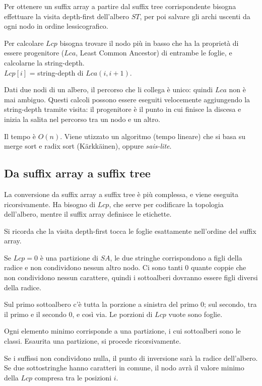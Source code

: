 Per ottenere un suffix array a partire dal suffix tree corrispondente bisogna effettuare la visita depth-first dell'albero $ST$, per poi salvare gli archi uscenti da ogni nodo in ordine lessicografico. 

Per calcolare $Lcp$ bisogna trovare il nodo più in basso che ha la proprietà di essere progenitore ($Lca$, Least Common Ancestor) di entrambe le foglie, e calcolarne la string-depth. \\
$Lcp[i]$ = string-depth di $Lca(i, i+1)$. 

Dati due nodi di un albero, il percorso che li collega è unico: quindi $Lca$ non è mai ambiguo. Questi calcoli possono essere eseguiti velocemente aggiungendo la string-depth tramite visita: il progenitore è il punto in cui finisce la discesa e inizia la salita nel percorso tra un nodo e un altro. 

Il tempo è $O(n)$. Viene utizzato un algoritmo (tempo lineare) che si basa su merge sort e radix sort (Kärkkäinen), oppure \textit{sais-lite}.

\subsection{Da suffix array a suffix tree}
La conversione da suffix array a suffix tree è più complessa, e viene eseguita ricorsivamente. Ha bisogno di $Lcp$, che serve per codificare la topologia dell'albero, mentre il suffix array definisce le etichette.

Si ricorda che la visita depth-first tocca le foglie esattamente nell'ordine del suffix array.

Se $Lcp = 0$ è una partizione di $SA$, le due stringhe corrispondono a figli della radice e non condividono nessun altro nodo. Ci sono tanti 0 quante coppie che non condividono nessun carattere, quindi i sottoalberi dovranno essere figli diversi della radice.

Sul primo sottoalbero c'è tutta la porzione a sinistra del primo 0; sul secondo, tra il primo e il secondo 0, e così via. Le porzioni di $Lcp$ vuote sono foglie.

Ogni elemento minimo corrisponde a una partizione, i cui sottoalberi sono le classi. Esaurita una partizione, si procede ricorsivamente.

Se i suffissi non condividono nulla, il punto di inversione sarà la radice dell'albero. Se due sottostringhe hanno caratteri in comune, il nodo avrà il valore minimo della $Lcp$ compresa tra le posizioni $i$. 

